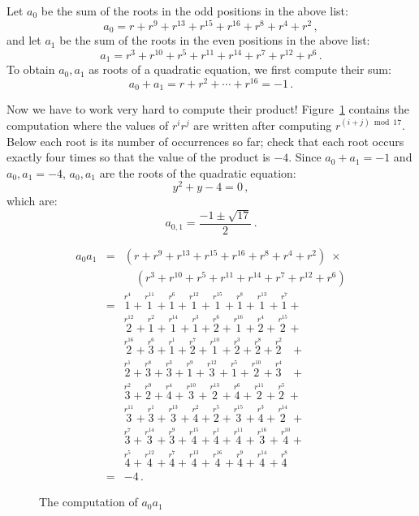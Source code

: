 \documentclass[11pt,a4paper]{article}
\newenvironment{form}[1]{%
\begin{displaymath}%
\renewcommand{\arraystretch}{#1}%
\begin{array}{lcl}}%
{\end{array}%
\end{displaymath}%
}
\newcommand*{\occ}[2]{%
  \stackrel{%
    \textstyle r^{#1}}%
    {\!\!\!\scriptscriptstyle #2}}
\begin{document}
Let $a_0$ be the sum of the roots in the odd positions in the above list:
\[
a_0=r + r^9 + r^{13} +r^{15} +r^{16} + r^8+r^4+r^2\,,
\]
and let $a_1$ be the sum of the roots in the even positions in the above list:
\[
a_1=r^3 + r^{10} + r^{5} +r^{11} +r^{14} + r^7+r^{12}+r^6\,.
\]
To obtain $a_0,a_1$ as roots of a quadratic equation, we first compute their sum:
\[
a_0+a_1=r + r^2 + \cdots +r^{16}=-1\,.
\]

Now we have to work very hard to compute their product! Figure~\ref{fig.a0a1} contains the computation where the values of $r^ir^j$ are written after computing $r^{(i+j) \bmod 17}$. Below each root is its number of occurrences so far; check that each root occurs exactly four times so that the value of the product is $-4$. Since $a_0+a_1=-1$ and $a_0,a_1=-4$, $a_0,a_1$ are the roots of the quadratic equation:
\[
y^2+y-4=0\,,
\]
which are:
\[
a_{0,1} = \frac{-1\pm\sqrt{17}}{2}\,.
\]
\begin{figure}[tb]
\begin{form}{1.5}
a_0a_1&=&(r + r^9 + r^{13} +r^{15} +r^{16} + r^8+r^4+r^2)\;\times\\

&&\quad (r^3 + r^{10} + r^{5} +r^{11} +r^{14} + r^7+r^{12}+r^6)\\

&=&\occ{4}{1} + \occ{11}{1} + \occ{6}{1} + \occ{12}{1} + \occ{15}{1} + \occ{8}{1} + \occ{13}{1} + \occ{7}{1} +\\

&&\occ{12}{2} + \occ{2}{1} + \occ{14}{1} + \occ{3}{1} + \occ{6}{2} + \occ{16}{1} + \occ{4}{2} + \occ{15}{2} +\\

&&\occ{16}{2} + \occ{6}{3} + \occ{1}{1} + \occ{7}{2} + \occ{10}{1} + \occ{3}{2} + \occ{8}{2} + \occ{2}{2}\;\;\: +\\

&&\occ{1}{2} + \occ{8}{3} + \occ{3}{3} + \occ{9}{1} + \occ{12}{3} + \occ{5}{1} + \occ{10}{2} + \occ{4}{3}\;\;\: +\\

&&\occ{2}{3} + \occ{9}{2} + \occ{4}{4} + \occ{10}{3} + \occ{13}{2} + \occ{6}{4} + \occ{11}{2} + \occ{5}{2} \:+\\

&&\occ{11}{3} + \occ{1}{3} + \occ{13}{3} + \occ{2}{4} + \occ{5}{2} + \occ{15}{3} + \occ{3}{4} + \occ{14}{2} \;+\\

&&\occ{7}{3} + \occ{14}{3} + \occ{9}{3} + \occ{15}{4} + \occ{1}{4} + \occ{11}{4} + \occ{16}{3} + \occ{10}{4} +\\

&&\occ{5}{4} + \occ{12}{4} + \occ{7}{4} + \occ{13}{4} + \occ{16}{4} + \occ{9}{4} + \occ{14}{4} + \occ{8}{4}\\
&=&-4\,.
\end{form}\vspace{-2em}
\caption{The computation of $a_0a_1$}\label{fig.a0a1}
\end{figure}
\end{document}
